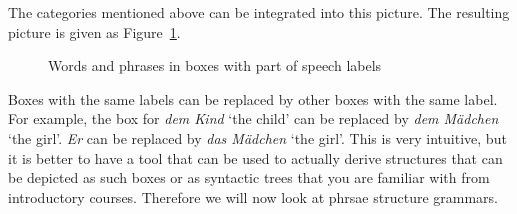 The categories mentioned above can be integrated into this picture. The resulting picture is given
as Figure~\ref{fig-boxes-pos}.
\begin{figure}
\centering
{}
\caption{\label{fig-boxes-pos}Words and phrases in boxes with part of speech labels}
\end{figure}
Boxes with the same labels can be replaced by other boxes with the same label. For example, the box
for \emph{dem Kind} `the child' can be replaced by \emph{dem Mädchen} `the girl'. \emph{Er} can be
replaced by \emph{das Mädchen} `the girl'. This is very intuitive, but it is better to have a tool
that can be used to actually derive structures that can be depicted as such boxes or as syntactic
trees that you are familiar with from introductory courses. Therefore we will now look at phrsae
structure grammars.

